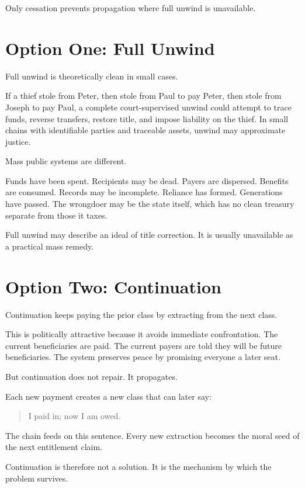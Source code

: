 \documentclass[12pt]{article}
\begin{document}
Only cessation prevents propagation where full unwind is unavailable.

\section{Option One: Full Unwind}

Full unwind is theoretically clean in small cases.

If a thief stole from Peter, then stole from Paul to pay Peter, then stole from Joseph to pay Paul, a complete court-supervised unwind could attempt to trace funds, reverse transfers, restore title, and impose liability on the thief. In small chains with identifiable parties and traceable assets, unwind may approximate justice.

Mass public systems are different.

Funds have been spent. Recipients may be dead. Payers are dispersed. Benefits are consumed. Records may be incomplete. Reliance has formed. Generations have passed. The wrongdoer may be the state itself, which has no clean treasury separate from those it taxes.

Full unwind may describe an ideal of title correction. It is usually unavailable as a practical mass remedy.

\section{Option Two: Continuation}

Continuation keeps paying the prior class by extracting from the next class.

This is politically attractive because it avoids immediate confrontation. The current beneficiaries are paid. The current payers are told they will be future beneficiaries. The system preserves peace by promising everyone a later seat.

But continuation does not repair. It propagates.

Each new payment creates a new class that can later say:

\begin{quote}
I paid in; now I am owed.
\end{quote}

The chain feeds on this sentence. Every new extraction becomes the moral seed of the next entitlement claim.

Continuation is therefore not a solution. It is the mechanism by which the problem survives.
\end{document}
